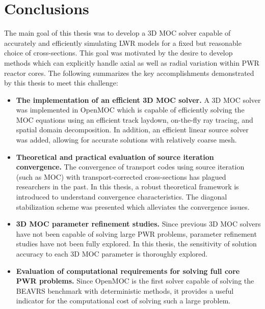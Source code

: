 \documentclass[12pt,twoside]{mitthesis-exec}
\begin{document}
\clearpage

\section*{Conclusions}

The main goal of this thesis was to develop a 3D MOC solver capable of accurately and efficiently simulating LWR models for a fixed but reasonable choice of cross-sections. This goal was motivated by the desire to develop methods which can explicitly handle axial as well as radial variation within PWR reactor cores. The following summarizes the key accomplishments demonstrated by this thesis to meet this challenge:

\begin{itemize}

\item \textbf{The implementation of an efficient 3D MOC solver.} A 3D MOC solver was implemented in OpenMOC which is capable of efficiently solving the MOC equations using an efficient track laydown, on-the-fly ray tracing, and spatial domain decomposition. In addition, an efficient linear source solver was added, allowing for accurate solutions with relatively coarse mesh.

\item \textbf{Theoretical and practical evaluation of source iteration convergence.} The convergence of transport codes using source iteration (such as MOC) with transport-corrected cross-sections has plagued researchers in the past. In this thesis, a robust theoretical framework is introduced to understand convergence characteristics. The diagonal stabilization scheme was presented which alleviates the convergence issues.

\item \textbf{3D MOC parameter refinement studies.} Since previous 3D MOC solvers have not been capable of solving large PWR problems, parameter refinement studies have not been fully explored. In this thesis, the sensitivity of solution accuracy to each 3D MOC parameter is thoroughly explored.

\item \textbf{Evaluation of computational requirements for solving full core PWR problems.} Since OpenMOC is the first solver capable of solving the BEAVRS benchmark with deterministic methods, it provides a useful indicator for the computational cost of solving such a large problem.

\end{itemize}
\end{document}
